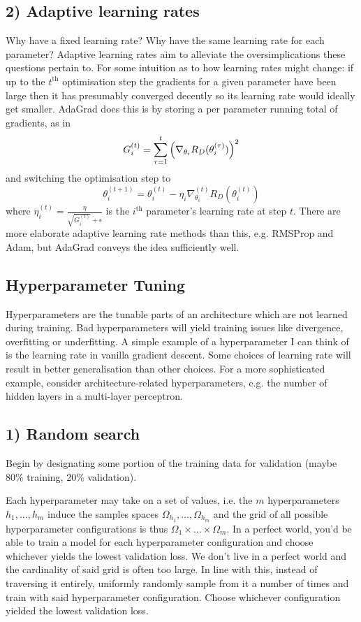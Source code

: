 \documentclass[11pt]{article}
\begin{document}
\subsection*{2) Adaptive learning rates}
Why have a fixed learning rate? Why have the same learning rate for each parameter? Adaptive learning rates aim to alleviate the oversimplications these questions pertain to. For some intuition as to how learning rates might change: if up to the $t^{\text{th}}$ optimisation step the gradients for a given parameter have been large then it has presumably converged decently so its learning rate would ideally get smaller. AdaGrad does this is by storing a per parameter running total of gradients, as in
$$
G_i^{(t)}
=
\sum_{\tau=1}^t\left(\nabla_{\theta_i}R_D(\theta_i^{(\tau)})\right)^2
$$
and switching the optimisation step to
$$
\theta_i^{(t+1)}
=
\theta_i^{(t)}-\eta_i\nabla_{\theta_i}^{(t)}R_D(\theta_i^{(t)})
$$
where $\eta_i^{(t)}=\frac{\eta}{\sqrt{G_i^{(t)}}+\epsilon}$ is the $i^{\text{th}}$ parameter's learning rate at step $t$. There are more elaborate adaptive learning rate methods than this, e.g. RMSProp and Adam, but AdaGrad conveys the idea sufficiently well.

\subsection{\IMPROVE Hyperparameter Tuning}
Hyperparameters are the tunable parts of an architecture which are not learned during training. Bad hyperparameters will yield training issues like divergence, overfitting or underfitting. A simple example of a hyperparameter I can think of is the learning rate in vanilla gradient descent. Some choices of learning rate will result in better generalisation than other choices. For a more sophisticated example, consider architecture-related hyperparameters, e.g. the number of hidden layers in a multi-layer perceptron.

\subsection*{1) Random search}
Begin by designating some portion of the training data for validation (maybe 80\% training, 20\% validation). 

Each hyperparameter may take on a set of values, i.e. the $m$ hyperparameters $h_1,\dots,h_m$ induce the samples spaces $\Omega_{h_1},\dots,\Omega_{h_m}$ and the grid of all possible hyperparameter configurations is thus $\Omega_1\times\dots\times\Omega_m$. In a perfect world, you'd be able to train a model for each hyperparameter configuration and choose whichever yields the lowest validation loss. We don't live in a perfect world and the cardinality of said grid is often too large. In line with this, instead of traversing it entirely, uniformly randomly sample from it a number of times and train with said hyperparameter configuration. Choose whichever configuration yielded the lowest validation loss.
\end{document}
